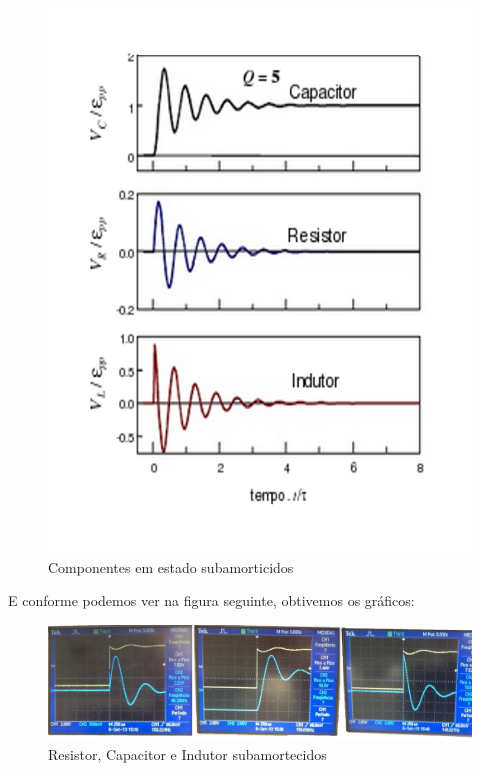 \documentclass[12pt,letterpaper]{article}
\begin{document}
\begin{figure}[!htb]
  \centering
  \label{subteo}
  \includegraphics[scale=0.30]{img/subamortecido.jpg}
  \caption{Componentes em estado subamorticidos}
\end{figure}
E conforme podemos ver na figura seguinte, obtivemos os gráficos:
\begin{figure}[!htb]
  \centering
  \label{mysub}
  \includegraphics[scale=0.18]{img/mysub.jpg}
  \caption{Resistor, Capacitor e Indutor subamortecidos}
\end{figure}
\\
\\
\\
\end{document}
